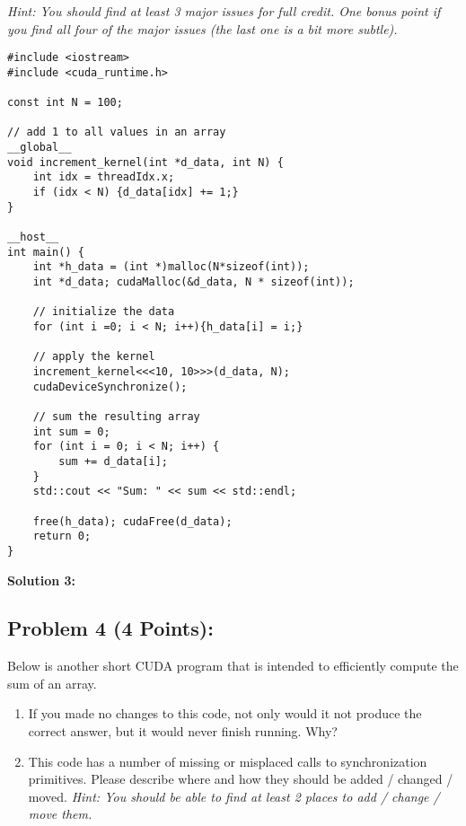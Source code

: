 \documentclass[]{article}
\begin{document}
\textit{Hint: You should find at least 3 major issues for full credit. One bonus point if you find all four of the major issues (the last one is a bit more subtle).}

\begin{lstlisting}
#include <iostream>
#include <cuda_runtime.h>

const int N = 100;

// add 1 to all values in an array
__global__
void increment_kernel(int *d_data, int N) {
    int idx = threadIdx.x;
    if (idx < N) {d_data[idx] += 1;}
}

__host__
int main() {
    int *h_data = (int *)malloc(N*sizeof(int));
    int *d_data; cudaMalloc(&d_data, N * sizeof(int));

    // initialize the data
    for (int i =0; i < N; i++){h_data[i] = i;}

    // apply the kernel
    increment_kernel<<<10, 10>>>(d_data, N);
    cudaDeviceSynchronize();

    // sum the resulting array
    int sum = 0;
    for (int i = 0; i < N; i++) {
        sum += d_data[i];
    }
    std::cout << "Sum: " << sum << std::endl;

    free(h_data); cudaFree(d_data);
    return 0;
}
\end{lstlisting}

\clearpage
\textbf{Solution 3:}

\clearpage

\subsection*{Problem 4 (4 Points):}
Below is another short CUDA program that is intended to efficiently compute the sum of an array.
\begin{enumerate}[label=(\alph*)]
    \item If you made no changes to this code, not only would it not produce the correct answer, but it would never finish running. Why?
    \item This code has a number of missing or misplaced calls to synchronization primitives. Please describe where and how they should be added / changed / moved. \textit{Hint: You should be able to find at least 2 places to add / change / move them.}
\end{enumerate}
\end{document}
